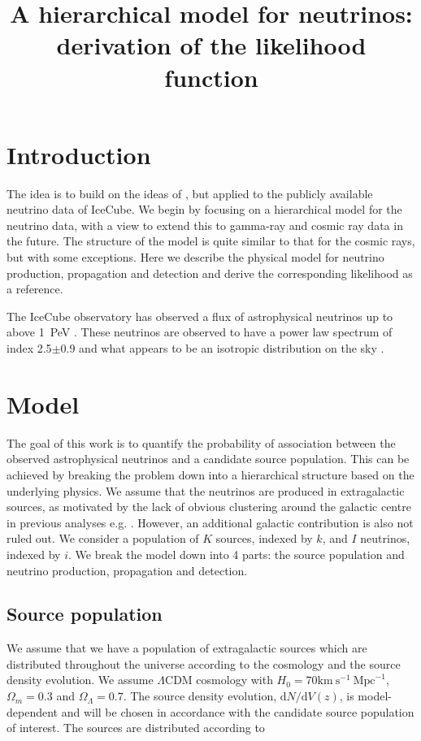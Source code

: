 \documentclass[fontsize=12pt]{article}
\title{\textbf{A hierarchical model for neutrinos: derivation of the likelihood function}}
\begin{document}
\maketitle

\section{Introduction}

The idea is to build on the ideas of \cite{Capel:2019hn, Soiaporn:tj}, but applied to the publicly available neutrino data of IceCube. We begin by focusing on a hierarchical model for the neutrino data, with a view to extend this to gamma-ray and cosmic ray data in the future. The structure of the model is quite similar to that for the cosmic rays, but with some exceptions. Here we describe the physical model for neutrino production, propagation and detection and derive the corresponding likelihood as a reference.

The IceCube observatory has observed a flux of astrophysical neutrinos up to above 1~PeV \cite{Collaboration:2013hx, Aartsen:2014cl}. These neutrinos are observed to have a power law spectrum of index 2.5$\pm$0.9 \cite{Aartsen:2015fr} and what appears to be an isotropic distribution on the sky \cite{Aartsen:2016oji}.

\section{Model}
\label{sec:model}

The goal of this work is to quantify the probability of association between the observed astrophysical neutrinos and a candidate source population. This can be achieved by breaking the problem down into a hierarchical structure based on the underlying physics. We assume that the neutrinos are produced in extragalactic sources, as motivated by the lack of obvious clustering around the galactic centre in previous analyses e.g. \cite{Aartsen:2016oji}. However, an additional galactic contribution is also not ruled out. We consider a population of $K$ sources, indexed by $k$, and $I$ neutrinos, indexed by $i$. We break the model down into 4 parts: the source population and neutrino production, propagation and detection.

\subsection{Source population}

We assume that we have a population of extragalactic sources which are distributed throughout the universe according to the cosmology and the source density evolution. We assume $\Lambda$CDM cosmology with $H_0 = 70 \mathrm{km} \ \mathrm{s}^{-1} \ \mathrm{Mpc}^{-1}$, $\Omega_m = 0.3$ and $\Omega_\Lambda = 0.7$. The source density evolution, $\mathrm{d}N/\mathrm{d}V(z)$, is model-dependent and will be chosen in accordance with the candidate source population of interest. The sources are distributed according to 
\end{document}
